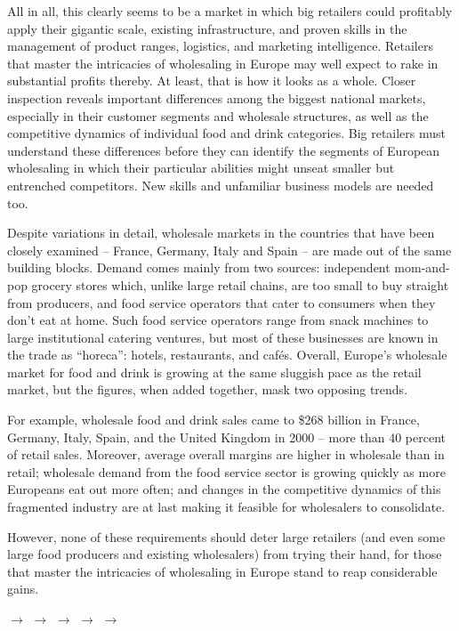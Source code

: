 \documentclass[12pt,a4paper]{article}
\begin{document}
\begin{partb}
\begin{enumerate}[label={[\Alph*]}, leftmargin=2em, itemsep=0.5em]
    \item All in all, this clearly seems to be a market in which big retailers could profitably apply their gigantic scale, existing infrastructure, and proven skills in the management of product ranges, logistics, and marketing intelligence. Retailers that master the intricacies of wholesaling in Europe may well expect to rake in substantial profits thereby. At least, that is how it looks as a whole. Closer inspection reveals important differences among the biggest national markets, especially in their customer segments and wholesale structures, as well as the competitive dynamics of individual food and drink categories. Big retailers must understand these differences before they can identify the segments of European wholesaling in which their particular abilities might unseat smaller but entrenched competitors. New skills and unfamiliar business models are needed too.

    \item Despite variations in detail, wholesale markets in the countries that have been closely examined -- France, Germany, Italy and Spain -- are made out of the same building blocks. Demand comes mainly from two sources: independent mom-and-pop grocery stores which, unlike large retail chains, are too small to buy straight from producers, and food service operators that cater to consumers when they don't eat at home. Such food service operators range from snack machines to large institutional catering ventures, but most of these businesses are known in the trade as ``horeca'': hotels, restaurants, and caf\'es. Overall, Europe's wholesale market for food and drink is growing at the same sluggish pace as the retail market, but the figures, when added together, mask two opposing trends.

    \item For example, wholesale food and drink sales came to \$268 billion in France, Germany, Italy, Spain, and the United Kingdom in 2000 -- more than 40 percent of retail sales. Moreover, average overall margins are higher in wholesale than in retail; wholesale demand from the food service sector is growing quickly as more Europeans eat out more often; and changes in the competitive dynamics of this fragmented industry are at last making it feasible for wholesalers to consolidate.

    \item However, none of these requirements should deter large retailers (and even some large food producers and existing wholesalers) from trying their hand, for those that master the intricacies of wholesaling in Europe stand to reap considerable gains.
\end{enumerate}

\vspace{1em}
 $\rightarrow$  $\rightarrow$  $\rightarrow$  $\rightarrow$  $\rightarrow$ 
\end{partb}
\end{document}
